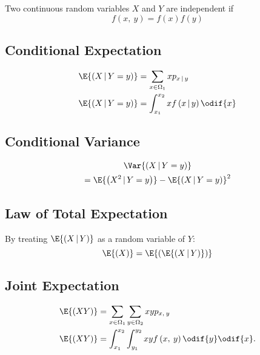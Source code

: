 \documentclass{article}
\begin{document}
\begin{multicols}{3}
    Two continuous random variables \(X\) and \(Y\) are independent if
    \begin{equation*}
        f\left( x,\: y \right) = f\left( x \right) f\left( y \right)
    \end{equation*}
    \subsection{Conditional Expectation}
    \begin{align*}
        \E{\left( X \,\vert\, Y = y \right)} & = \sum_{x\in\Omega_1} x p_{x\,\vert\,y}                     \\
        \E{\left( X \,\vert\, Y = y \right)} & = \int_{x_1}^{x_2} x f\left( x \,\vert\, y \right) \odif{x}
    \end{align*}
    \subsection{Conditional Variance}
    \begin{multline*}
        \Var{\left( X \,\vert\, Y = y \right)} \\
        = \E{\left( X^2 \,\vert\, Y = y \right)} - \E{\left( X \,\vert\, Y = y \right)}^2
    \end{multline*}
    \subsection{Law of Total Expectation}
    By treating \(\E{\left( X \,\vert\, Y \right)}\) as a random
    variable of \(Y\):
    \begin{equation*}
        \E{\left( X \right)} = \E{\left( \E{\left( X \,\vert\, Y \right)} \right)}
    \end{equation*}
    \subsection{Joint Expectation}
    \begin{align*}
        \E{\left( XY \right)} & = \sum_{x\in\Omega_1} \sum_{y\in\Omega_2} xy p_{x,\: y}                          \\
        \E{\left( XY \right)} & = \int_{x_1}^{x_2} \int_{y_1}^{y_2} xy f\left( x,\: y \right) \odif{y} \odif{x}.
    \end{align*}

\end{multicols}
\end{document}
